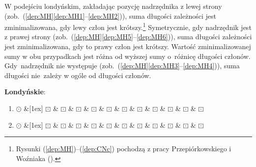 \documentclass[licencjacka]{pracamgr_Kogni}
\begin{document}
    W podejściu londyńskim, zakładając pozycję nadrzędnika z lewej strony (zob.~(\ref{dep:MH}\ref{dep:MH1}--\ref{dep:MH2})), suma długości zależności jest zminimalizowana, gdy lewy człon jest krótszy.\footnote{Rysunki (\ref{dep:MH})--(\ref{dep:CNc}) pochodzą z pracy Przepiórkowskiego i Woźniaka (\citeyear{Przepiorkowski2023}).}
    Symetrycznie, gdy nadrzędnik jest z prawej strony (zob.~(\ref{dep:MH}\ref{dep:MH5}--\ref{dep:MH6})), suma długości zależności jest zminimalizowana, gdy to prawy człon jest krótszy.
    Wartość zminimalizowanej sumy w obu przypadkach jest różna od wyższej sumy o~różnicę długości członów.
    Gdy~nadrzędnik nie występuje (zob.~(\ref{dep:MH}\ref{dep:MH3}--\ref{dep:MH4})), suma długości nie~zależy w ogóle od długości członów.
    \newpage
    \begin{exe}
        \ex\label{dep:MH} \textbf{Londyńskie}:
        \begin{enumerate}[label=\alph{enumi}., ref=\alph{enumi}]
            \item 
            \begin{dependency}[baseline=-3pt, hide label, edge height=.5em]
              \begin{deptext}[column sep=.1ex]
                $\odot$  \&[1ex] $\boxdot$ \& $\boxdot$ \& $\boxdot$ \& $\boxdot$ \& $\boxdot$ \& $\boxdot$ \& $\boxdot$ \& $\boxdot$ \& $\boxdot$ \& $\boxdot$ \& $\boxdot$\\
              \end{deptext}
            \end{dependency}
            \label{dep:MH1}
          \item 
            \begin{dependency}[baseline=-3pt, hide label, edge height=.5em]
              \begin{deptext}[column sep=.1ex]
                $\odot$  \&[1ex] $\boxdot$ \& $\boxdot$ \& $\boxdot$ \& $\boxdot$ \& $\boxdot$ \& $\boxdot$ \& $\boxdot$ \& $\boxdot$ \& $\boxdot$ \& $\boxdot$ \& $\boxdot$\\
              \end{deptext}
            \end{dependency}

\end{enumerate}
\end{exe}
\end{document}
